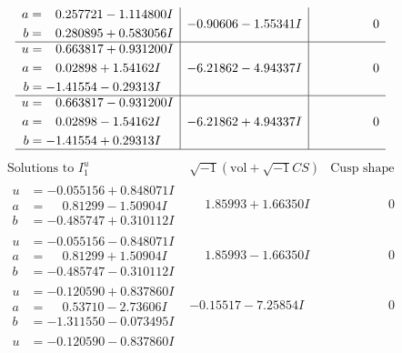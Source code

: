 \documentclass[1p]{elsarticle_modified}
\theoremstyle{definition}
\newcommand{\I}{\sqrt{-1}}
\begin{document}
$$\begin{array}{c|c|c}
\begin{aligned}
a &= \phantom{-}0.257721 - 1.114800 I \\
b &= \phantom{-}0.280895 + 0.583056 I\end{aligned}
 & -0.90606 - 1.55341 I & \phantom{-0.000000 } 0 \\ \hline\begin{aligned}
u &= \phantom{-}0.663817 + 0.931200 I \\
a &= \phantom{-}0.02898 + 1.54162 I \\
b &= -1.41554 - 0.29313 I\end{aligned}
 & -6.21862 - 4.94337 I & \phantom{-0.000000 } 0 \\ \hline\begin{aligned}
u &= \phantom{-}0.663817 - 0.931200 I \\
a &= \phantom{-}0.02898 - 1.54162 I \\
b &= -1.41554 + 0.29313 I\end{aligned}
 & -6.21862 + 4.94337 I & \phantom{-0.000000 } 0\\
 \hline 
 \end{array}$$\newpage$$\begin{array}{c|c|c}  
\text{Solutions to }I^u_{1}& \I (\text{vol} + \sqrt{-1}CS) & \text{Cusp shape}\\
 \hline 
\begin{aligned}
u &= -0.055156 + 0.848071 I \\
a &= \phantom{-}0.81299 - 1.50904 I \\
b &= -0.485747 + 0.310112 I\end{aligned}
 & \phantom{-}1.85993 + 1.66350 I & \phantom{-0.000000 } 0 \\ \hline\begin{aligned}
u &= -0.055156 - 0.848071 I \\
a &= \phantom{-}0.81299 + 1.50904 I \\
b &= -0.485747 - 0.310112 I\end{aligned}
 & \phantom{-}1.85993 - 1.66350 I & \phantom{-0.000000 } 0 \\ \hline\begin{aligned}
u &= -0.120590 + 0.837860 I \\
a &= \phantom{-}0.53710 - 2.73606 I \\
b &= -1.311550 - 0.073495 I\end{aligned}
 & -0.15517 - 7.25854 I & \phantom{-0.000000 } 0 \\ \hline\begin{aligned}
u &= -0.120590 - 0.837860 I \\

\end{aligned}
\end{array}$$
\end{document}
